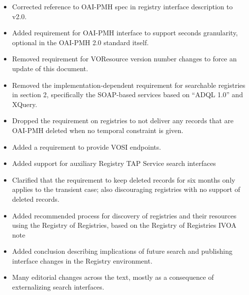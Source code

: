 \documentclass{ivoa}
\begin{document}
\begin{itemize}

\item Corrected reference to OAI-PMH spec in registry interface
description to v2.0.

\item Added requirement for OAI-PMH interface to support seconds
granularity, optional in the OAI-PMH 2.0 standard itself. {}

\item Removed requirement for VOResource version number changes to force
an update of this document. {}

\item Removed the implementation-dependent requirement for searchable
registries in section 2, specifically the SOAP-based services
based on ``ADQL 1.0'' and XQuery.{}

\item Dropped the requirement on registries to not deliver any records
that are OAI-PMH deleted when no temporal constraint is given.{}

\item Added a requirement to provide VOSI endpoints.

\item Added support for auxiliary Registry TAP Service search interfaces

\item Clarified that the requirement to keep deleted records for six
months only applies to the transient case; also discouraging registries
with no support of deleted records.

\item Added recommended process for discovery of registries and their
resources using the Registry of Registries, based on the Registry of
Registries IVOA note

\item Added conclusion describing implications of future search and 
publishing interface changes in the Registry environment.

\item Many editorial changes across the text, mostly as a consequence of
externalizing search interfaces.

\end{itemize}



\end{document}
